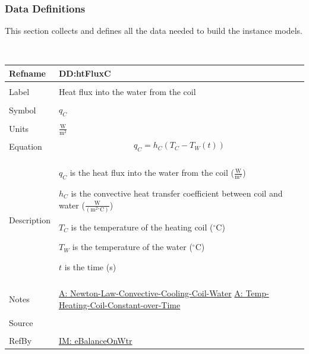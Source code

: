 \documentclass[12pt]{article}
\begin{document}
\subsubsection{Data Definitions}
\label{Sec:DDs}
This section collects and defines all the data needed to build the instance models.
\par~

\noindent \begin{minipage}{\textwidth}
\begin{tabular}{>{\raggedright}p{}>{\raggedright\arraybackslash}p{}}
\toprule \textbf{Refname} & \textbf{DD:htFluxC}
\label{DD:htFluxC}
\\ \midrule \\
Label & Heat flux into the water from the coil
\\ \midrule \\
Symbol & ${q_{C}}$
\\ \midrule \\
Units & $\frac{\text{W}}{\text{m}^{2}}$
\\ \midrule \\
Equation & \begin{displaymath}
           {q_{C}}={h_{C}} \left({T_{C}}-{T_{W}}\left(t\right)\right)
           \end{displaymath}
\\ \midrule \\
Description & \begin{symbDescription}
              \item{${q_{C}}$ is the heat flux into the water from the coil ($\frac{\text{W}}{\text{m}^{2}}$)}
              \item{${h_{C}}$ is the convective heat transfer coefficient between coil and water ($\frac{\text{W}}{(\text{m}^{2}{}^{\circ}\text{C})}$)}
              \item{${T_{C}}$ is the temperature of the heating coil (${}^{\circ}$C)}
              \item{${T_{W}}$ is the temperature of the water (${}^{\circ}$C)}
              \item{$t$ is the time (s)}
              \end{symbDescription}
\\ \midrule \\
Notes & \hyperref[assumpLCCCW]{A: Newton-Law-Convective-Cooling-Coil-Water}
        \hyperref[assumpTHCCoT]{A: Temp-Heating-Coil-Constant-over-Time}
\\ \midrule \\
Source & \cite{koothoor2013}
\\ \midrule \\
RefBy & \hyperref[IM:eBalanceOnWtr]{IM: eBalanceOnWtr}
\\ \bottomrule
\end{tabular}
\end{minipage}
\par~
\end{document}
